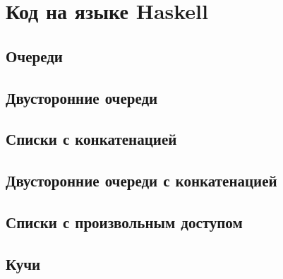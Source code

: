 \appendix
\chapter{Код на языке Haskell}
\label{app:A}
\lstset{language=Haskell}
\section{Очереди}

\codesep

\codesep

\codesep

\codesep

\codesep

\codesep


\section{Двусторонние очереди}

\codesep


\section{Списки с конкатенацией}

\codesep


\section{Двусторонние очереди с конкатенацией}

\codesep

\codesep


\section{Списки с произвольным доступом}

\codesep

\codesep

\codesep


\section{Кучи}

\codesep


